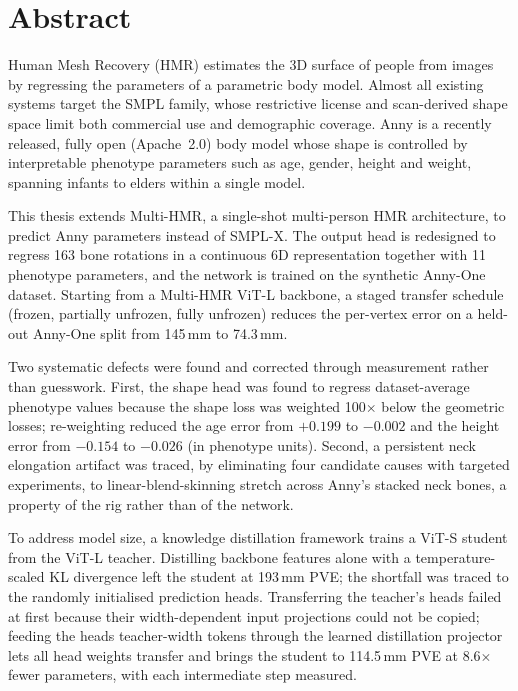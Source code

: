 \chapter*{Abstract}

Human Mesh Recovery (HMR) estimates the 3D surface of people from images by
regressing the parameters of a parametric body model. Almost all existing
systems target the SMPL family, whose restrictive license and scan-derived
shape space limit both commercial use and demographic coverage. Anny is a
recently released, fully open (Apache~2.0) body model whose shape is
controlled by interpretable phenotype parameters such as age, gender, height
and weight, spanning infants to elders within a single model.

This thesis extends Multi-HMR, a single-shot multi-person HMR architecture, to
predict Anny parameters instead of SMPL-X. The output head is redesigned to
regress 163 bone rotations in a continuous 6D representation together with 11
phenotype parameters, and the network is trained on the synthetic Anny-One
dataset. Starting from a Multi-HMR ViT-L backbone, a staged
transfer schedule (frozen, partially unfrozen, fully unfrozen) reduces the
per-vertex error on a held-out Anny-One split from 145\,mm to 74.3\,mm.

Two systematic defects were found and corrected through measurement rather than
guesswork. First, the shape head was found to regress dataset-average phenotype
values because the shape loss was weighted 100$\times$ below the geometric
losses; re-weighting reduced the age error from $+0.199$ to $-0.002$ and the
height error from $-0.154$ to $-0.026$ (in phenotype units). Second, a
persistent neck elongation artifact was traced, by eliminating four candidate
causes with targeted experiments, to linear-blend-skinning stretch across
Anny's stacked neck bones, a property of the rig rather than of the network.

To address model size, a knowledge distillation framework trains a ViT-S
student from the ViT-L teacher. Distilling backbone features alone with a
temperature-scaled KL divergence left the student at 193\,mm PVE; the
shortfall was traced to the randomly initialised prediction heads. Transferring
the teacher's heads failed at first because their width-dependent input
projections could not be copied; feeding the heads teacher-width tokens
through the learned distillation projector lets all head weights transfer and
brings the student to 114.5\,mm PVE at 8.6$\times$ fewer parameters, with each
intermediate step measured.

